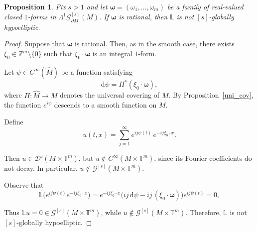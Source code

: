 \documentclass[11pt,reqno]{amsart}
\numberwithin{equation}{section}
\newtheorem{proposition}[theorem]{Proposition}
\begin{document}
	\begin{proposition}\label{prop_rat}
		Fix $s>1$ and let $\boldsymbol{\omega}=(\omega_1,\dots,\omega_m)$ be a family of real-valued closed $1$-forms in $\mathsf{\Lambda}^1\mathscr{G}^{[s]}_{\partial M}(M)$. 
		If $\boldsymbol{\omega}$ is rational, then $\mathbb{L}$ is not ${[s]}$-globally hypoelliptic.
	\end{proposition}
	
	\begin{proof}
		Suppose that $\boldsymbol{\omega}$ is rational. 
		Then, as in the smooth case, there exists $\xi_0\in\mathbb{Z}^m\setminus\{0\}$ such that $\xi_0\cdot\boldsymbol{\omega}$ is an integral $1$-form.
		
		Let $\psi\in C^\infty(\hat M)$ be a function satisfying
		\[
		\mathrm{d}\psi = \Pi^*(\xi_0\cdot\boldsymbol{\omega}),
		\]
		where $\Pi:\hat M\to M$ denotes the universal covering of $M$. 
		By Proposition~\ref{uni_cov}, the function $e^{i\psi}$ descends to a smooth function on $M$.
		
		Define
		\[
		u(t,x) 	= \sum_{j=1}^\infty e^{ij\psi(t)}\,e^{-ij\xi_0\cdot x}.
		\]
		
		Then $u\in\mathscr{D}'(M\times\mathbb{T}^m)$, but $u\notin C^\infty(M\times\mathbb{T}^m)$, since its Fourier coefficients do not decay. In particular, $u\notin \mathscr{G}^{[s]} (M\times\mathbb{T}^m)$.
		
		Observe that
		\[
		\mathbb{L}\big(e^{ij\psi(t)}e^{-ij\xi_0\cdot x}\big) = e^{-ij\xi_0\cdot x}
		\big( ij\,\mathrm{d}\psi - ij\,(\xi_0\cdot\boldsymbol{\omega}) \big) e^{ij\psi(t)} =0,
		\]

		Thus $\mathbb{L}u=0\in\mathscr{G}^{[s]}(M\times\mathbb{T}^m)$, while 
		$u\notin\mathscr{G}^{[s]}(M\times\mathbb{T}^m)$. 
		Therefore, $\mathbb{L}$ is not ${[s]}$-globally hypoelliptic.
	\end{proof}
	
\end{document}
